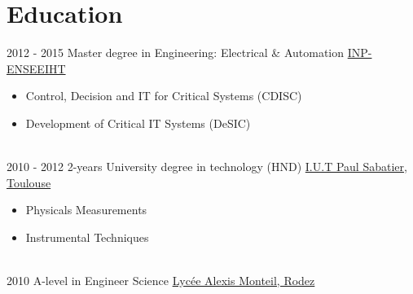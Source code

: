 \documentclass[letterpaper]{twentysecondcv} %
\begin{document}
\makeprofile %

\section{Education}
\begin{twenty}
  \twentyitem
  {2012 - 2015}
  {}
  {Master degree in Engineering: Electrical \& Automation}
  {\href{http://www.enseeiht.fr/en/index.html}{INP-ENSEEIHT}}
  {
    \vspace{-2mm}               %
    \begin{itemize}
    \item \small Control, Decision and IT for Critical Systems (CDISC)
    \item \small Development of Critical IT Systems (DeSIC)
    \end{itemize}
  }
  \\
  \twentyitem
  {2010 - 2012}
  {}
  {2-years University degree in technology (HND)}
  {\href{http://iut-meph.ups-tlse.fr/}{I.U.T Paul Sabatier, Toulouse}}
  {
    \vspace{-2mm}
    \begin{itemize}
    \item \small Physicals Measurements
    \item \small Instrumental Techniques
    \end{itemize}
  }
  \\
  \twentyitem
  {2010}
  {}
  {A-level in Engineer Science}
  {\href{http://alexis-monteil.entmip.fr/}{Lycée Alexis Monteil, Rodez}}
  {}
\end{twenty}
\end{document}
